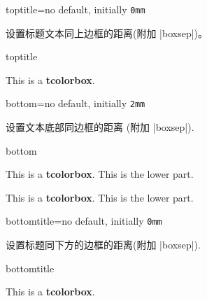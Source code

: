 \begin{docTcbKey}{toptitle}{=}{no default, initially \texttt{0mm}}

设置标题文本同上边框的距离(附加 |boxsep|)。    
\begin{exdispExample}{toptitle}

\begin{tcolorbox}[toptitle=3mm,title=My title]
This is a \textbf{tcolorbox}.
\end{tcolorbox}
\end{exdispExample}
\end{docTcbKey}






\begin{docTcbKey}{bottom}{=}{no default, initially \texttt{2mm}}

设置文本底部同边框的距离 (附加 |boxsep|).
\begin{exdispExample}{bottom}

\begin{tcolorbox}[bottom=0mm]
This is a \textbf{tcolorbox}.
\tcblower
This is the lower part.
\end{tcolorbox}
\begin{tcolorbox}
  This is a \textbf{tcolorbox}.
  \tcblower
  This is the lower part.
  \end{tcolorbox}
\end{exdispExample}
\end{docTcbKey}

\begin{docTcbKey}{bottomtitle}{=}{no default, initially \texttt{0mm}}

设置标题同下方的边框的距离(附加 |boxsep|).
\begin{exdispExample}{bottomtitle}

\begin{tcolorbox}[bottomtitle=3mm,title=My title]
This is a \textbf{tcolorbox}.
\end{tcolorbox}
\end{exdispExample}
\end{docTcbKey}


